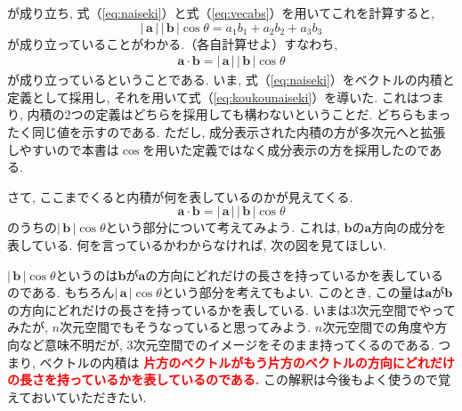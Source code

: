 が成り立ち, 式（\ref{eq:naiseki}）と式（\ref{eq:vecabs}）を用いてこれを計算すると, 
$$
| \, \bm{a} \, | \, | \, \bm{b} \, | \cos \theta = a_1 b_1 + a_2 b_2 + a_3 b_3
$$
が成り立っていることがわかる.（各自計算せよ）すなわち, 
\begin{eqnarray}
\bm{a} \cdot \bm{b} =| \, \bm{a} \, | \, | \, \bm{b} \, | \cos \theta 
\label{eq:koukounaiseki}
\end{eqnarray}
が成り立っているということである. 
いま, 式（\ref{eq:naiseki}）をベクトルの内積と定義として採用し, それを用いて式（\ref{eq:koukounaiseki}）を導いた. 
これはつまり, 内積の2つの定義はどちらを採用しても構わないということだ. どちらもまったく同じ値を示すのである. 
ただし, 成分表示された内積の方が多次元へと拡張しやすいので本書は$\cos$を用いた定義ではなく成分表示の方を採用したのである. 

さて, ここまでくると内積が何を表しているのかが見えてくる. 
$$
\bm{a} \cdot \bm{b} = | \, \bm{a} \, | \, | \, \bm{b} \, | \cos \theta 
$$
のうちの$| \, \bm{b} \, |\cos \theta$という部分について考えてみよう. 
これは, $\bm{b}$の$\bm{a}$方向の成分を表している. 何を言っているかわからなければ, 次の図を見てほしい. 
\begin{center}
\end{center}
$| \, \bm{b} \, | \cos \theta$というのは$\bm{b}$が$\bm{a}$の方向にどれだけの長さを持っているかを表しているのである. 
もちろん$| \, \bm{a} \, |\cos \theta$という部分を考えてもよい. 
このとき, この量は$\bm{a}$が$\bm{b}$の方向にどれだけの長さを持っているかを表している. 
いまは3次元空間でやってみたが, $n$次元空間でもそうなっていると思ってみよう. 
$n$次元空間での角度や方向など意味不明だが, 3次元空間でのイメージをそのまま持ってくるのである. 
つまり, ベクトルの内積は
\textbf{\textcolor{red}{片方のベクトルがもう片方のベクトルの方向にどれだけの長さを持っているかを表しているのである.}}
この解釈は今後もよく使うので覚えておいていただきたい. 

